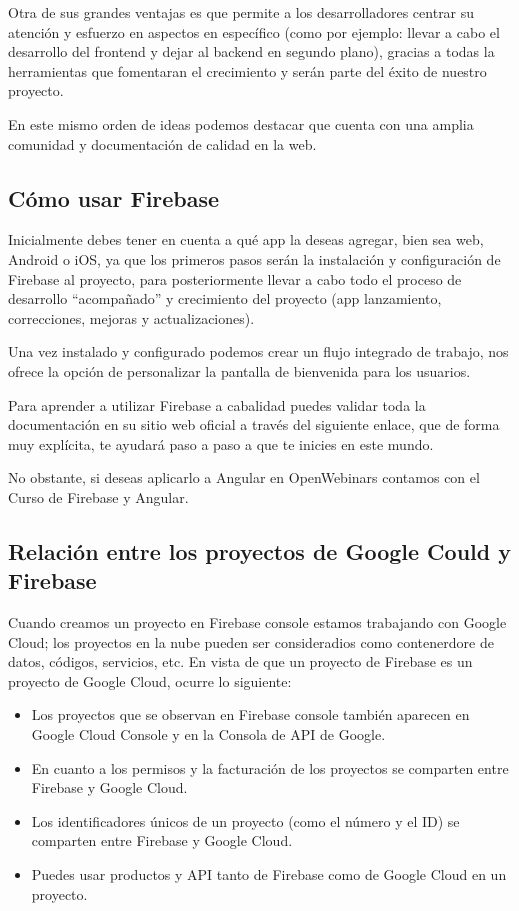 \documentclass{article}
\begin{document}
Otra de sus grandes ventajas es que permite a los desarrolladores centrar su atención y esfuerzo en aspectos en específico (como por ejemplo: llevar a cabo el desarrollo del frontend y dejar al backend en segundo plano), gracias a todas la herramientas que fomentaran el crecimiento y serán parte del éxito de nuestro proyecto.

En este mismo orden de ideas podemos destacar que cuenta con una amplia comunidad y documentación de calidad en la web.

\subsection{Cómo usar Firebase}

Inicialmente debes tener en cuenta a qué app la deseas agregar, bien sea web, Android o iOS, ya que los primeros pasos serán la instalación y configuración de Firebase al proyecto, para posteriormente llevar a cabo todo el proceso de desarrollo “acompañado” y crecimiento del proyecto (app lanzamiento, correcciones, mejoras y actualizaciones).

Una vez instalado y configurado podemos crear un flujo integrado de trabajo, nos ofrece la opción de personalizar la pantalla de bienvenida para los usuarios.

Para aprender a utilizar Firebase a cabalidad puedes validar toda la documentación en su sitio web oficial a través del siguiente enlace, que de forma muy explícita, te ayudará paso a paso a que te inicies en este mundo.

No obstante, si deseas aplicarlo a Angular en OpenWebinars contamos con el Curso de Firebase y Angular.

\subsection{Relación entre los proyectos de Google Could y Firebase}
Cuando creamos un proyecto en Firebase console estamos trabajando con Google Cloud; los proyectos en la nube pueden ser consideradios como contenerdore de datos, códigos, servicios, etc. En vista de que un proyecto de Firebase es un proyecto de Google Cloud, ocurre lo siguiente:


\begin{itemize}
\item Los proyectos que se observan en Firebase console también aparecen en Google Cloud Console y en la Consola de API de Google.
\item En cuanto a los permisos y la facturación de los proyectos se comparten entre Firebase y Google Cloud.
\item Los identificadores únicos de un proyecto (como el número y el ID) se comparten entre Firebase y Google Cloud.
\item Puedes usar productos y API tanto de Firebase como de Google Cloud en un proyecto.
\end{itemize}
\end{document}
